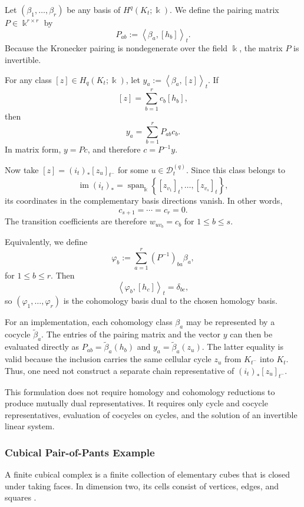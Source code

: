 \documentclass[11pt]{article}
\theoremstyle{paperdefinition}
\theoremstyle{paperplain}
\theoremstyle{paperremark}
\begin{document}
Let $(\beta_1,\ldots,\beta_r)$ be any basis of $H^q(K_t;\Bbbk)$. We define the pairing matrix $P\in\Bbbk^{r\times r}$ by
\[
P_{ab} := \left\langle\beta_a,[h_b]\right\rangle_t.
\]
Because the Kronecker pairing is nondegenerate over the field $\Bbbk$, the matrix $P$ is invertible.

For any class $[z]\in H_q(K_t;\Bbbk)$, let $y_a := \left\langle\beta_a,[z] \right\rangle_t$. If
\[
[z] = \sum_{b=1}^r c_b[h_b],
\]
then
\[
y_a = \sum_{b=1}^rP_{ab}c_b.
\]
In matrix form, $y=Pc$, and therefore $c=P^{-1}y$.

Now take $[z] = (i_t)_*[z_u]_{t^-}$ for some $u\in\mathcal D_t^{(q)}$. Since this class belongs to
\[
\operatorname{im}(i_t)_* = \operatorname{span}_{\Bbbk}\left\{[z_{v_1}]_t,\ldots,[z_{v_s}]_t\right\},
\]
its coordinates in the complementary basis directions vanish. In other words,
\[
c_{s+1} = \cdots = c_r = 0.
\]
The transition coefficients are therefore $w_{u v_b}=c_b$ for $1\leq b\leq s$.

Equivalently, we define
\[
\varphi_b := \sum_{a=1}^r(P^{-1})_{ba}\beta_a,
\]
for $1\leq b\leq r$. Then
\[
\left\langle\varphi_b,[h_c]\right\rangle_t = \delta_{bc},
\]
so $(\varphi_1,\ldots,\varphi_r)$ is the cohomology basis dual to the chosen homology basis.

For an implementation, each cohomology class $\beta_a$ may be represented by a cocycle $\widetilde\beta_a$. The entries of the pairing matrix and the vector $y$ can then be evaluated directly as $P_{ab} = \widetilde\beta_a(h_b)$ and $y_a = \widetilde\beta_a(z_u)$. The latter equality is valid because the inclusion carries the same cellular cycle $z_u$ from $K_{t^-}$ into $K_t$. Thus, one need not construct a separate chain representative of $(i_t)_*[z_u]_{t^-}$.

This formulation does not require homology and cohomology reductions to produce mutually dual representatives. It requires only cycle and cocycle representatives, evaluation of cocycles on cycles, and the solution of an invertible linear system.

\subsubsection{Cubical Pair-of-Pants Example}
\label{subsubsec:pair-of-pants-example}

A finite cubical complex is a finite collection of elementary cubes that is closed under taking faces. In dimension two, its cells consist of vertices, edges, and squares \cite{wagner2012cubical,bleile2022digital}.
\end{document}
